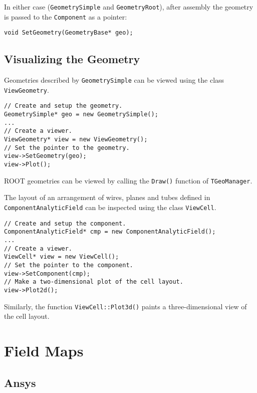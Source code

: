 In either case (\texttt{GeometrySimple} and \texttt{GeometryRoot}),
after assembly the geometry is passed to the \texttt{Component} as a pointer:
\begin{lstlisting}
void SetGeometry(GeometryBase* geo);
\end{lstlisting}

\subsection{Visualizing the Geometry}

Geometries described by \texttt{GeometrySimple} can be viewed 
using the class \texttt{ViewGeometry}. 
\begin{lstlisting}
// Create and setup the geometry.
GeometrySimple* geo = new GeometrySimple();
...
// Create a viewer.
ViewGeometry* view = new ViewGeometry();
// Set the pointer to the geometry.
view->SetGeometry(geo);
view->Plot();
\end{lstlisting}

ROOT geometries can be viewed by calling the \texttt{Draw()} function of
\texttt{TGeoManager}. 

The layout of an arrangement of wires, planes and tubes
defined in \texttt{ComponentAnalyticField} 
can be inspected using the class \texttt{ViewCell}.
\begin{lstlisting}
// Create and setup the component.
ComponentAnalyticField* cmp = new ComponentAnalyticField();
... 
// Create a viewer.
ViewCell* view = new ViewCell();
// Set the pointer to the component.
view->SetComponent(cmp);
// Make a two-dimensional plot of the cell layout.
view->Plot2d();
\end{lstlisting}
Similarly, the function \texttt{ViewCell::Plot3d()} paints
a three-dimensional view of the cell layout.

\section{Field Maps}

\subsection{Ansys}

